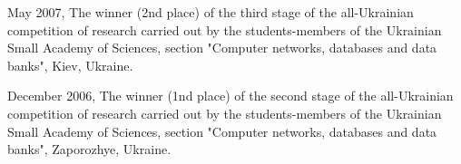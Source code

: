 \documentclass[helvetica,openbib,nologo,notitle,totpages]{europecv}
\begin{document}
\begin{europecv}
{\begin{list}{\textbullet}{}
	\item May 2007, The winner (2nd place) of the third stage of the all-Ukrainian competition of research carried out by the students-members of the Ukrainian Small Academy of Sciences, section "Computer networks, databases and data banks", Kiev, Ukraine.
	
	\item December 2006, The winner (1nd place) of the second stage of the all-Ukrainian competition of research carried out by the students-members of the Ukrainian Small Academy of Sciences, section "Computer networks, databases and data banks", Zaporozhye, Ukraine.	
	
\end{list}
}





\end{europecv}
\end{document}
